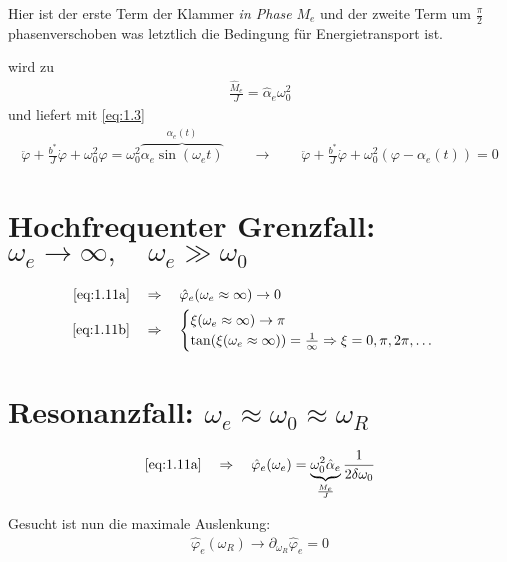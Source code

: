         Hier ist der erste Term der Klammer \textit{in Phase} \(M_e\) und der zweite Term um \(\frac{\pi}{2}\) phasenverschoben was letztlich die Bedingung für Energietransport ist.\par\medskip

         wird zu
        \begin{align}
            \frac{\hat{M}_e}{J} = \hat{\alpha}_e \omega_0^2\nonumber
        \end{align}
        und liefert mit \cref{eq:1.3}
        \begin{align}
            \ddot{\varphi} + \frac{b^\ast}{J}\dot{\varphi} + \omega_0^2 \varphi = \omega_0^2 \overbrace{\alpha_e \sin(\omega_e t)}^{\alpha_e(t)} \qquad \rightarrow \qquad \ddot{\varphi} + \frac{b^\ast}{J}\dot{\varphi} + \omega_0^2 (\varphi - \alpha_e(t)) = 0\nonumber
        \end{align}

    \section{Hochfrequenter Grenzfall: \(\omega_e \rightarrow \infty, \quad \omega_e \gg \omega_0\)}

        \begin{align}
            \cref{eq:1.11a} \quad &\Rightarrow \quad \hat{\varphi}_e(\omega_e \approx \infty) \rightarrow 0\nonumber\\
            \cref{eq:1.11b} \quad &\Rightarrow \quad
            \begin{cases}
            \xi(\omega_e \approx \infty) \rightarrow \pi\\
            \tan(\xi(\omega_e \approx \infty)) = \frac{1}{\infty} \Rightarrow \xi = 0,\pi,2\pi,\dots
            \end{cases}\nonumber
        \end{align}

    \section{Resonanzfall: \(\omega_e \approx \omega_0 \approx \omega_R \)}

        \begin{align}
            \cref{eq:1.11a} \quad \Rightarrow \quad \hat{\varphi}_e(\omega_e) = \underbrace{\omega_0^2 \hat{\alpha}_e}_{\frac{M_e}{J}} \frac{1}{2\delta\omega_0}
        \end{align}

        Gesucht ist nun die maximale Auslenkung:
        \begin{align}
            \hat{\varphi}_e(\omega_R) \rightarrow \partial_{\omega_R} \hat{\varphi}_e = 0\nonumber
        \end{align}

